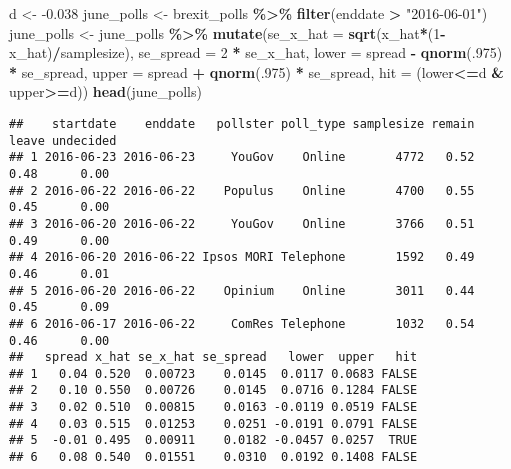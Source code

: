 \documentclass[
]{article}
\newenvironment{Shaded}{\begin{snugshade}}{\end{snugshade}}
\newcommand{\DataTypeTok}[1]{\textcolor[rgb]{0.13,0.29,0.53}{#1}}
\newcommand{\DecValTok}[1]{\textcolor[rgb]{0.00,0.00,0.81}{#1}}
\newcommand{\FloatTok}[1]{\textcolor[rgb]{0.00,0.00,0.81}{#1}}
\newcommand{\KeywordTok}[1]{\textcolor[rgb]{0.13,0.29,0.53}{\textbf{#1}}}
\newcommand{\NormalTok}[1]{#1}
\newcommand{\OperatorTok}[1]{\textcolor[rgb]{0.81,0.36,0.00}{\textbf{#1}}}
\newcommand{\StringTok}[1]{\textcolor[rgb]{0.31,0.60,0.02}{#1}}
\begin{document}
\begin{Shaded}
\begin{Highlighting}[]
\NormalTok{d \textless{}{-}}\StringTok{ }\FloatTok{{-}0.038}
\NormalTok{june\_polls \textless{}{-}}\StringTok{ }\NormalTok{brexit\_polls }\OperatorTok{\%\textgreater{}\%}
\StringTok{  }\KeywordTok{filter}\NormalTok{(enddate }\OperatorTok{\textgreater{}}\StringTok{ "2016{-}06{-}01"}\NormalTok{)}
\NormalTok{june\_polls \textless{}{-}}\StringTok{ }\NormalTok{june\_polls }\OperatorTok{\%\textgreater{}\%}
\StringTok{  }\KeywordTok{mutate}\NormalTok{(}\DataTypeTok{se\_x\_hat =} \KeywordTok{sqrt}\NormalTok{(x\_hat}\OperatorTok{*}\NormalTok{(}\DecValTok{1}\OperatorTok{{-}}\NormalTok{x\_hat)}\OperatorTok{/}\NormalTok{samplesize),}
           \DataTypeTok{se\_spread =} \DecValTok{2} \OperatorTok{*}\StringTok{ }\NormalTok{se\_x\_hat,}
           \DataTypeTok{lower =}\NormalTok{ spread }\OperatorTok{{-}}\StringTok{ }\KeywordTok{qnorm}\NormalTok{(.}\DecValTok{975}\NormalTok{) }\OperatorTok{*}\StringTok{ }\NormalTok{se\_spread,}
           \DataTypeTok{upper =}\NormalTok{ spread }\OperatorTok{+}\StringTok{ }\KeywordTok{qnorm}\NormalTok{(.}\DecValTok{975}\NormalTok{) }\OperatorTok{*}\StringTok{ }\NormalTok{se\_spread,}
           \DataTypeTok{hit =}\NormalTok{ (lower}\OperatorTok{\textless{}=}\NormalTok{d }\OperatorTok{\&}\StringTok{ }\NormalTok{upper}\OperatorTok{\textgreater{}=}\NormalTok{d))}
\KeywordTok{head}\NormalTok{(june\_polls)}
\end{Highlighting}
\end{Shaded}

\begin{verbatim}
##    startdate    enddate   pollster poll_type samplesize remain leave undecided
## 1 2016-06-23 2016-06-23     YouGov    Online       4772   0.52  0.48      0.00
## 2 2016-06-22 2016-06-22    Populus    Online       4700   0.55  0.45      0.00
## 3 2016-06-20 2016-06-22     YouGov    Online       3766   0.51  0.49      0.00
## 4 2016-06-20 2016-06-22 Ipsos MORI Telephone       1592   0.49  0.46      0.01
## 5 2016-06-20 2016-06-22    Opinium    Online       3011   0.44  0.45      0.09
## 6 2016-06-17 2016-06-22     ComRes Telephone       1032   0.54  0.46      0.00
##   spread x_hat se_x_hat se_spread   lower  upper   hit
## 1   0.04 0.520  0.00723    0.0145  0.0117 0.0683 FALSE
## 2   0.10 0.550  0.00726    0.0145  0.0716 0.1284 FALSE
## 3   0.02 0.510  0.00815    0.0163 -0.0119 0.0519 FALSE
## 4   0.03 0.515  0.01253    0.0251 -0.0191 0.0791 FALSE
## 5  -0.01 0.495  0.00911    0.0182 -0.0457 0.0257  TRUE
## 6   0.08 0.540  0.01551    0.0310  0.0192 0.1408 FALSE
\end{verbatim}
\end{document}
